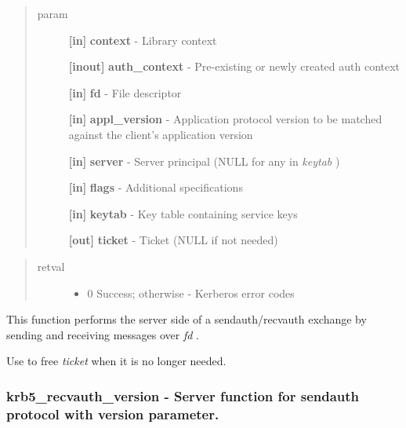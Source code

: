 \documentclass[letterpaper,10pt,english]{sphinxmanual}
\begin{document}
\begin{quote}\begin{description}
\item[{param}] \leavevmode
\textbf{{[}in{]}} \textbf{context} - Library context

\textbf{{[}inout{]}} \textbf{auth\_context} - Pre-existing or newly created auth context

\textbf{{[}in{]}} \textbf{fd} - File descriptor

\textbf{{[}in{]}} \textbf{appl\_version} - Application protocol version to be matched against the client's application version

\textbf{{[}in{]}} \textbf{server} - Server principal (NULL for any in \emph{keytab} )

\textbf{{[}in{]}} \textbf{flags} - Additional specifications

\textbf{{[}in{]}} \textbf{keytab} - Key table containing service keys

\textbf{{[}out{]}} \textbf{ticket} - Ticket (NULL if not needed)

\end{description}\end{quote}
\begin{quote}\begin{description}
\item[{retval}] \leavevmode\begin{itemize}
\item {} 
0   Success; otherwise - Kerberos error codes

\end{itemize}

\end{description}\end{quote}

This function performs the server side of a sendauth/recvauth exchange by sending and receiving messages over \emph{fd} .

Use {\hyperref[appdev/refs/api/krb5_free_ticket:krb5_free_ticket]{}} to free \emph{ticket} when it is no longer needed.




{\hyperref[appdev/refs/api/krb5_sendauth:krb5_sendauth]{}}




\subsubsection{krb5\_recvauth\_version -  Server function for sendauth protocol with version parameter.}
\label{appdev/refs/api/krb5_recvauth_version::doc}\label{appdev/refs/api/krb5_recvauth_version:krb5-recvauth-version-server-function-for-sendauth-protocol-with-version-parameter}
\end{document}
